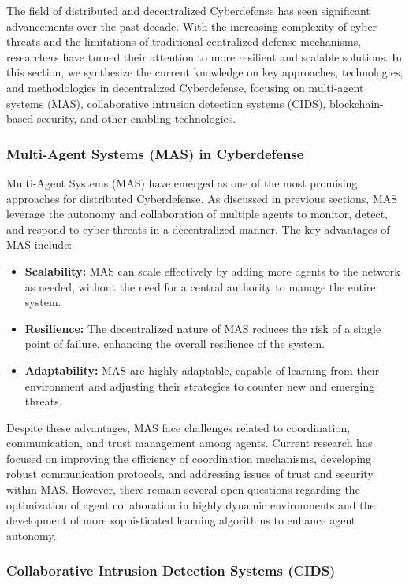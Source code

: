 The field of distributed and decentralized Cyberdefense has seen significant advancements over the past decade. With the increasing complexity of cyber threats and the limitations of traditional centralized defense mechanisms, researchers have turned their attention to more resilient and scalable solutions. In this section, we synthesize the current knowledge on key approaches, technologies, and methodologies in decentralized Cyberdefense, focusing on multi-agent systems (MAS), collaborative intrusion detection systems (CIDS), blockchain-based security, and other enabling technologies.

\subsubsection{Multi-Agent Systems (MAS) in Cyberdefense}

Multi-Agent Systems (MAS) have emerged as one of the most promising approaches for distributed Cyberdefense. As discussed in previous sections, MAS leverage the autonomy and collaboration of multiple agents to monitor, detect, and respond to cyber threats in a decentralized manner. The key advantages of MAS include:

\begin{itemize}
    \item \textbf{Scalability:} MAS can scale effectively by adding more agents to the network as needed, without the need for a central authority to manage the entire system.
    \item \textbf{Resilience:} The decentralized nature of MAS reduces the risk of a single point of failure, enhancing the overall resilience of the system.
    \item \textbf{Adaptability:} MAS are highly adaptable, capable of learning from their environment and adjusting their strategies to counter new and emerging threats.
\end{itemize}

Despite these advantages, MAS face challenges related to coordination, communication, and trust management among agents. Current research has focused on improving the efficiency of coordination mechanisms, developing robust communication protocols, and addressing issues of trust and security within MAS. However, there remain several open questions regarding the optimization of agent collaboration in highly dynamic environments and the development of more sophisticated learning algorithms to enhance agent autonomy.

\subsubsection{Collaborative Intrusion Detection Systems (CIDS)}

